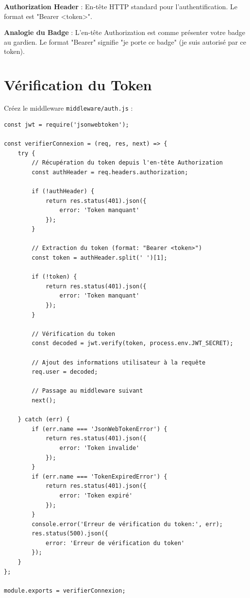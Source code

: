 \begin{definitionbox}
    \textbf{Authorization Header} : En-tête HTTP standard pour l'authentification. Le format est "Bearer <token>".
\end{definitionbox}

\begin{analogybox}
    \textbf{Analogie du Badge} : L'en-tête Authorization est comme présenter votre badge au gardien. Le format "Bearer" signifie "je porte ce badge" (je suis autorisé par ce token).
\end{analogybox}

\section{Vérification du Token}

Créez le middleware \texttt{middleware/auth.js} :

\begin{lstlisting}[style=javascript, caption=middleware/auth.js - Middleware de vérification JWT]
const jwt = require('jsonwebtoken');

const verifierConnexion = (req, res, next) => {
    try {
        // Récupération du token depuis l'en-tête Authorization
        const authHeader = req.headers.authorization;
        
        if (!authHeader) {
            return res.status(401).json({ 
                error: 'Token manquant' 
            });
        }
        
        // Extraction du token (format: "Bearer <token>")
        const token = authHeader.split(' ')[1];
        
        if (!token) {
            return res.status(401).json({ 
                error: 'Token manquant' 
            });
        }
        
        // Vérification du token
        const decoded = jwt.verify(token, process.env.JWT_SECRET);
        
        // Ajout des informations utilisateur à la requête
        req.user = decoded;
        
        // Passage au middleware suivant
        next();
        
    } catch (err) {
        if (err.name === 'JsonWebTokenError') {
            return res.status(401).json({ 
                error: 'Token invalide' 
            });
        }
        if (err.name === 'TokenExpiredError') {
            return res.status(401).json({ 
                error: 'Token expiré' 
            });
        }
        console.error('Erreur de vérification du token:', err);
        res.status(500).json({ 
            error: 'Erreur de vérification du token' 
        });
    }
};

module.exports = verifierConnexion;
\end{lstlisting}

